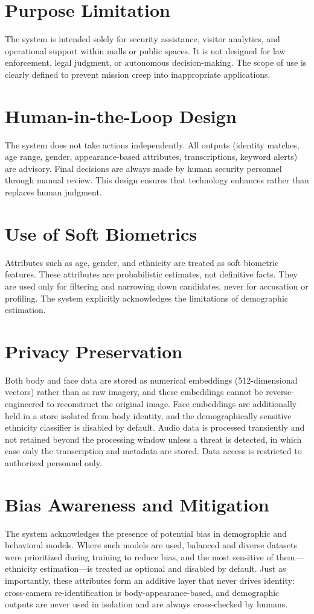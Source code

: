 \documentclass[12pt]{report}
\begin{document}
\section{Purpose Limitation}
The system is intended solely for security assistance, visitor analytics, and operational support within malls or public spaces. It is not designed for law enforcement, legal judgment, or autonomous decision-making. The scope of use is clearly defined to prevent mission creep into inappropriate applications.

\section{Human-in-the-Loop Design}
The system does not take actions independently. All outputs (identity matches, age range, gender, appearance-based attributes, transcriptions, keyword alerts) are advisory. Final decisions are always made by human security personnel through manual review. This design ensures that technology enhances rather than replaces human judgment.

\section{Use of Soft Biometrics}
Attributes such as age, gender, and ethnicity are treated as soft biometric features. These attributes are probabilistic estimates, not definitive facts. They are used only for filtering and narrowing down candidates, never for accusation or profiling. The system explicitly acknowledges the limitations of demographic estimation.

\section{Privacy Preservation}
Both body and face data are stored as numerical embeddings (512-dimensional vectors) rather than as raw imagery, and these embeddings cannot be reverse-engineered to reconstruct the original image. Face embeddings are additionally held in a store isolated from body identity, and the demographically sensitive ethnicity classifier is disabled by default. Audio data is processed transiently and not retained beyond the processing window unless a threat is detected, in which case only the transcription and metadata are stored. Data access is restricted to authorized personnel only.

\section{Bias Awareness and Mitigation}
The system acknowledges the presence of potential bias in demographic and behavioral models. Where such models are used, balanced and diverse datasets were prioritized during training to reduce bias, and the most sensitive of them---ethnicity estimation---is treated as optional and disabled by default. Just as importantly, these attributes form an additive layer that never drives identity: cross-camera re-identification is body-appearance-based, and demographic outputs are never used in isolation and are always cross-checked by humans.
\end{document}
